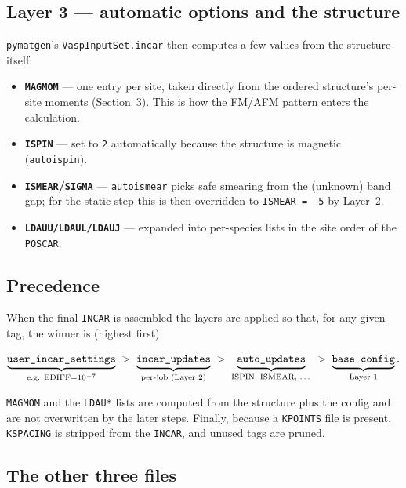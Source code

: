\documentclass[11pt]{article}
\newcommand{\code}[1]{\texttt{\def\_{\textunderscore\allowbreak}#1}}
\begin{document}
\subsection{Layer 3 --- automatic options and the structure}

\code{pymatgen}'s \code{VaspInputSet.incar} then computes a few values from the
structure itself:

\begin{itemize}
  \item \textbf{\code{MAGMOM}} --- one entry per site, taken directly from the
        ordered structure's per-site moments (Section~3). This is how the FM/AFM
        pattern enters the calculation.
  \item \textbf{\code{ISPIN}} --- set to \code{2} automatically because the
        structure is magnetic (\code{auto\_ispin}).
  \item \textbf{\code{ISMEAR}/\code{SIGMA}} --- \code{auto\_ismear} picks safe
        smearing from the (unknown) band gap; for the static step this is then
        overridden to \code{ISMEAR = -5} by Layer~2.
  \item \textbf{\code{LDAUU/LDAUL/LDAUJ}} --- expanded into per-species lists in
        the site order of the \code{POSCAR}.
\end{itemize}

\subsection{Precedence}

When the final \code{INCAR} is assembled the layers are applied so that, for any
given tag, the winner is (highest first):

\[
\underbrace{\texttt{user\_incar\_settings}}_{\text{e.g. EDIFF}=10^{-7}}
\;>\;
\underbrace{\texttt{incar\_updates}}_{\text{per-job (Layer 2)}}
\;>\;
\underbrace{\texttt{auto\_updates}}_{\text{ISPIN, ISMEAR, \dots}}
\;>\;
\underbrace{\texttt{base config}}_{\text{Layer 1}} .
\]

\code{MAGMOM} and the \code{LDAU*} lists are computed from the structure plus the
config and are not overwritten by the later steps. Finally, because a
\code{KPOINTS} file is present, \code{KSPACING} is stripped from the
\code{INCAR}, and unused tags are pruned.

\subsection{The other three files}
\end{document}
